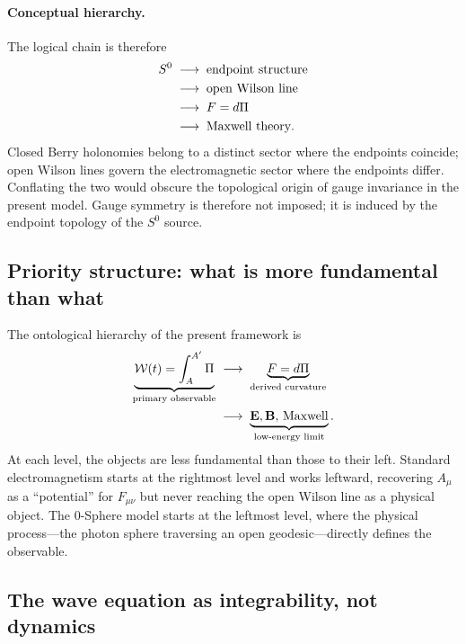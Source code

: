 \documentclass[%
 reprint, amsmath,amssymb, aps, prb, ]{revtex4-2}
\numberwithin{equation}{section}
\newcommand{\WL}{\mathcal{W}}
\begin{document}
\paragraph{Conceptual hierarchy.}
The logical chain is therefore
\begin{align}
S^0
&\;\longrightarrow\;
\text{endpoint structure}
\notag\\
&\;\longrightarrow\;
\text{open Wilson line}
\notag\\
&\;\longrightarrow\;
F=d\Pi
\notag\\
&\;\longrightarrow\;
\text{Maxwell theory}.
\label{eq:chain}
\end{align}
Closed Berry holonomies belong to a distinct sector where the endpoints coincide; open Wilson lines govern the electromagnetic sector where the endpoints differ. Conflating the two would obscure the topological origin of gauge invariance in the present model. Gauge symmetry is therefore not imposed; it is induced by the endpoint topology of the $S^0$ source.

\subsection{Priority structure: what is more fundamental than what}

The ontological hierarchy of the present framework is
\begin{align}
\underbrace{\WL(t) = \int_A^{A'}\Pi}_{\text{primary observable}}
&\;\longrightarrow\;
\underbrace{F = d\Pi}_{\text{derived curvature}}
\notag\\
&\;\longrightarrow\;
\underbrace{\mathbf{E},\mathbf{B},\,\text{Maxwell}}_{\text{low-energy limit}}.
\label{eq:hierarchy}
\end{align}
At each level, the objects are less fundamental than those to their left. Standard electromagnetism starts at the rightmost level and works leftward, recovering $A_\mu$ as a ``potential'' for $F_{\mu\nu}$ but never reaching the open Wilson line as a physical object. The 0-Sphere model starts at the leftmost level, where the physical process---the photon sphere traversing an open geodesic---directly defines the observable.

\subsection{The wave equation as integrability, not dynamics}
\end{document}
